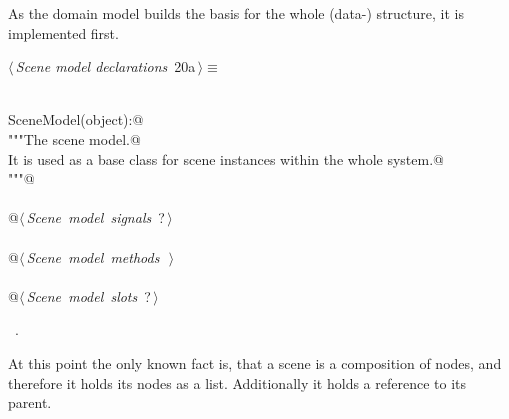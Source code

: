 \documentclass[
    a4paper,      %
    10pt,         %
    openright,    %
    notitlepage,  %
    parskip=half, %
]{scrreprt}       %
\theoremstyle{definition}                    %
\begin{document}
As the domain model builds the basis for the whole (data-) structure, it is
implemented first.

\begin{flushleft} \small
\begin{minipage}{\linewidth}\label{scrap12}\raggedright\small
{} $\langle\,${\itshape Scene model declarations}\nobreak\ {\footnotesize {20a}}$\,\rangle\equiv$
\vspace{-1exm}
\begin{list}{}{} \item
\mbox{}\lstinline@@\\
\mbox{}\lstinline@class SceneModel(object):@\\
\mbox{}\lstinline@    """The scene model.@\\
\mbox{}\lstinline@    It is used as a base class for scene instances within the whole system.@\\
\mbox{}\lstinline@    """@\\
\mbox{}\lstinline@@\\
\mbox{}\lstinline@    @\hbox{$\langle\,${\itshape Scene model signals}\nobreak\ {\footnotesize ?}$\,\rangle$}\lstinline@@\\
\mbox{}\lstinline@@\\
\mbox{}\lstinline@    @\hbox{$\langle\,${\itshape Scene model methods}\nobreak\ {\footnotesize {}}$\,\rangle$}\lstinline@@\\
\mbox{}\lstinline@@\\
\mbox{}\lstinline@    @\hbox{$\langle\,${\itshape Scene model slots}\nobreak\ {\footnotesize ?}$\,\rangle$}\lstinline@@\\
\mbox{}\lstinline@@{\NWsep}
\end{list}
\vspace{-1.5ex}
\footnotesize
\begin{list}{}{\setlength{\itemsep}{-\parsep}\setlength{\itemindent}{-\leftmargin}}
\item \NWtxtMacroRefIn\ .

\item{}
\end{list}
\end{minipage}\vspace{4ex}
\end{flushleft}
At this point the only known fact is, that a scene is a composition of nodes,
and therefore it holds its nodes as a list. Additionally it holds a reference to
its parent.
\end{document}
